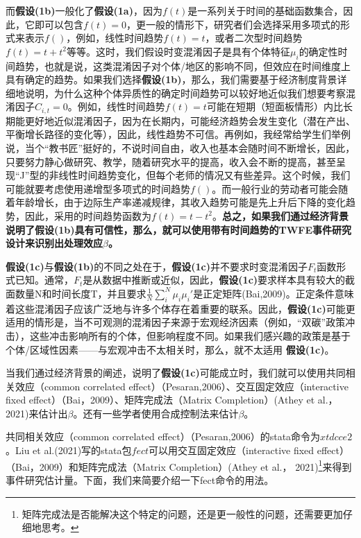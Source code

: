 \documentclass[cn,12pt,math=newtx,citestyle=gb7714-2015,bibstyle=gb7714-2015]{elegantbook}
\begin{document}
	而\textbf{假设(1b)}一般化了\textbf{假设(1a)}，因为$f(t)$是一系列关于时间的基础函数集合，因此，它即可以包含$f(t)=0$，更一般的情形下，研究者们会选择采用多项式的形式来表示$f()$，例如，线性时间趋势$f(t)=t$，或者二次型时间趋势$f(t)=t+t^2$等等。这时，我们假设时变混淆因子是具有个体特征$\mu_i$的确定性时间趋势，也就是说，这类混淆因子对个体/地区的影响不同，但效应在时间维度上具有确定的趋势。如果我们选择\textbf{假设(1b)}，那么，我们需要基于经济制度背景详细地说明，为什么这种个体异质性的确定时间趋势可以较好地近似我们想要考察混淆因子$C_{i,t}=0$。例如，线性时间趋势$f(t)=t$可能在短期（短面板情形）内比长期能更好地近似混淆因子，因为在长期内，可能经济趋势会发生变化（潜在产出、平衡增长路径的变化等），因此，线性趋势不可信。再例如，我经常给学生们举例说，当个“教书匠”挺好的，不说时间自由，收入也基本会随时间不断增长，因此，只要努力静心做研究、教学，随着研究水平的提高，收入会不断的提高，甚至呈现“J”型的非线性时间趋势变化，但每个老师的情况又有些差异。这个时候，我们可能就要考虑使用递增型多项式的时间趋势$f()$。而一般行业的劳动者可能会随着年龄增长，由于边际生产率递减规律，其收入趋势可能是先上升后下降的变化趋势，因此，采用的时间趋势函数为$f(t)=t-t^2$。\textbf{总之，如果我们通过经济背景说明了假设(1b)具有可信性，那么，就可以使用带有时间趋势的TWFE事件研究设计来识别出处理效应$\beta$。}
	
	\textbf{假设(1c)}与\textbf{假设(1b)}的不同之处在于，\textbf{假设(1c)}并不要求时变混淆因子$F_t$函数形式已知。通常，$F_t$是从数据中推断或近似，因此，\textbf{假设(1c)}要求样本具有较大的截面数量N和时间长度T，并且要求$\frac{1}{N}\sum_i^N \mu_i \mu_i'$是正定矩阵(Bai,2009)。正定条件意味着这些混淆因子应该广泛地与许多个体存在着重要的联系。因此，\textbf{假设(1c)}可能更适用的情形是，当不可观测的混淆因子来源于宏观经济因素（例如，“双碳”政策冲击），这些冲击影响所有的个体，但影响程度不同。如果我们感兴趣的政策是基于个体/区域性因素——与宏观冲击不太相关时，那么，就不太适用	\textbf{假设(1c)}。
	
		当我们通过经济背景的阐述，说明了\textbf{假设(1c)}可能成立时，我们就可以使用共同相关效应（common correlated effect）（Pesaran,2006）、交互固定效应（interactive fixed effect）（Bai，2009）、矩阵完成法（Matrix Completion）(Athey et al.， 2021)来估计出$\beta$。还有一些学者使用合成控制法来估计$\beta$。
		
		共同相关效应（common correlated effect）（Pesaran,2006）的stata命令为$xtdcce2$。Liu et al.(2021)写的stata包$fect$可以用交互固定效应（interactive fixed effect）（Bai，2009）和矩阵完成法（Matrix Completion）(Athey et al.， 2021)\footnote{矩阵完成法是否能解决这个特定的问题，还是更一般性的问题，还需要更加仔细地思考。}来得到事件研究估计量。下面，我们来简要介绍一下fect命令的用法。
		
\end{document}
